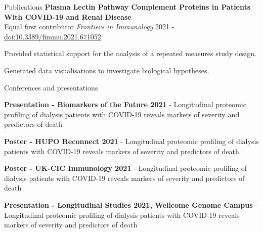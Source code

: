 \documentclass{resume}
\begin{document}
\begin{rSection}{Publications}
\textbf{Plasma Lectin Pathway Complement Proteins in Patients With COVID-19 and Renal Disease} \\
Equal first contributor \hfill  \textit{Frontiers in Immunology} 2021 - \href{https://doi.org/10.3389/fimmu.2021.671052}{doi:10.3389/fimmu.2021.671052}

\vspace{2pt plus 1pt minus 1pt}
\item Provided statistical support for the analysis of a repeated measures study design.
\item Generated data visualisations to investigate biological hypotheses. \\

\end{rSection}

\begin{rSection}{Conferences and presentations}

\item \textbf{Presentation - Biomarkers of the Future 2021} - Longitudinal proteomic profiling of dialysis patients with COVID-19 reveals markers of severity and predictors of death
\vspace{2pt plus 1pt minus 1pt}

\item \textbf{Poster - HUPO Reconnect 2021} - Longitudinal proteomic profiling of dialysis patients with COVID-19 reveals markers of severity and predictors of death
\vspace{2pt plus 1pt minus 1pt}

\item \textbf{Poster - UK-CIC Immunology 2021} - Longitudinal proteomic profiling of dialysis patients with COVID-19 reveals markers of severity and predictors of death
\vspace{2pt plus 1pt minus 1pt}

\item \textbf{Presentation - Longitudinal Studies 2021, Wellcome Genome Campus} - Longitudinal proteomic profiling of dialysis patients with COVID-19 reveals markers of severity and predictors of death
\vspace{2pt plus 1pt minus 1pt}

\end{rSection}
\end{document}
